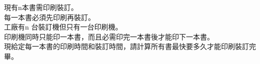 現有n本書需印刷裝訂。\\
每一本書必須先印刷再裝訂。\\
工廠有n 台裝訂機但只有一台印刷機。\\
印刷機同時只能印一本書，而且必需印完一本書後才能印下一本書。\\
現給定每一本書的印刷時間和裝訂時間，請計算所有書最快要多久才能印刷裝訂完畢。\\

